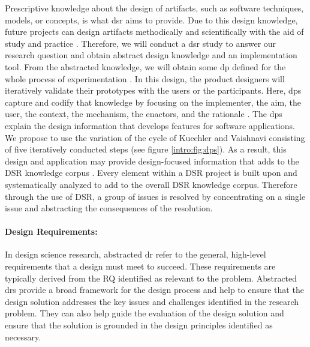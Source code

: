 Prescriptive knowledge about the design of artifacts, such as software techniques, models, or concepts, is what \ac{dsr} aims to provide.
Due to this design knowledge, future projects can design artifacts methodically and scientifically with the aid of study and practice \cite{paper:designprinciple:vk}. 
Therefore, we will conduct a \ac{dsr} study to answer our research question and obtain abstract design knowledge and an implementation tool. 
From the abstracted knowledge, we will obtain some \ac{dp} defined for the whole process of experimentation \cite{paper:designprinciple:vk}.
In this design, the product designers will iteratively validate their prototypes with the users or the participants. 
Here, \ac{dp}s capture and codify that knowledge by focusing on the implementer, the aim, the user, the context, the mechanism, the enactors, and the rationale \cite{paper:designprinciple:gregor}. 
The \ac{dp}s explain the design information that develops features for software applications.
We propose to use the variation of the cycle of Kuechler and Vaishnavi \cite{paper:designprinciple:vk} consisting of five iteratively conducted steps (see figure \ref{intro:fig:dps}). 
As a result, this design and application may provide design-focused information that adds to the DSR knowledge corpus \cite{misc:dsr:henver}.
Every element within a DSR project is built upon and systematically analyzed to add to the overall DSR knowledge corpus.
Therefore through the use of DSR, a group of issues is resolved by concentrating on a single issue and abstracting the consequences of the resolution.

\paragraph*{Design Requirements:}
In design science research, abstracted \ac{dr} refer to the general, high-level requirements that a design must meet to succeed. 
These requirements are typically derived from the RQ identified as relevant to the problem.
Abstracted \ac{dr}s provide a broad framework for the design process and help to ensure that the design solution addresses the key issues and challenges identified in the research problem. 
They can also help guide the evaluation of the design solution and ensure that the solution is grounded in the design principles identified as necessary.

